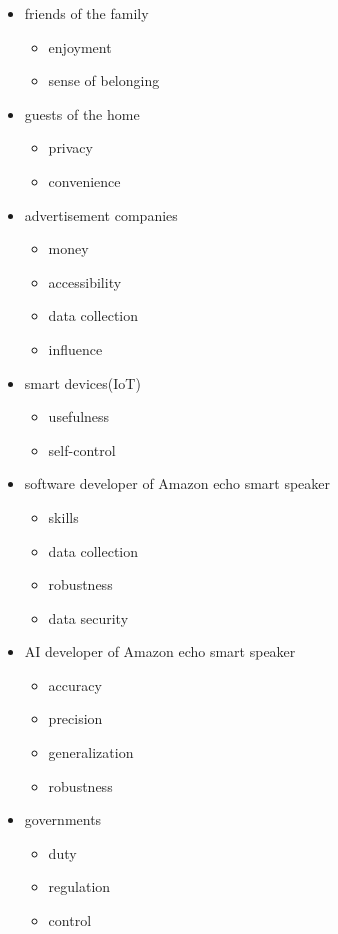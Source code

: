 \documentclass{article}
\begin{document}
\begin{itemize}
\item friends of the family
\begin{itemize}
    \item enjoyment
    \item sense of belonging
\end{itemize}

\item guests of the home
\begin{itemize}
    \item privacy
    \item convenience
\end{itemize}

\item advertisement companies
\begin{itemize}
    \item money
    \item accessibility
    \item data collection
    \item influence
\end{itemize}

\item smart devices(IoT)
\begin{itemize}
    \item usefulness
    \item self-control
\end{itemize}

\item software developer of Amazon echo smart speaker
\begin{itemize}
    \item skills
    \item data collection
    \item robustness
    \item data security
\end{itemize}

\item AI developer of Amazon echo smart speaker
\begin{itemize}
    \item accuracy
    \item precision
    \item generalization
    \item robustness
\end{itemize}

\item governments
\begin{itemize}
    \item duty
    \item regulation
    \item control
\end{itemize}


\end{itemize}
\end{document}
